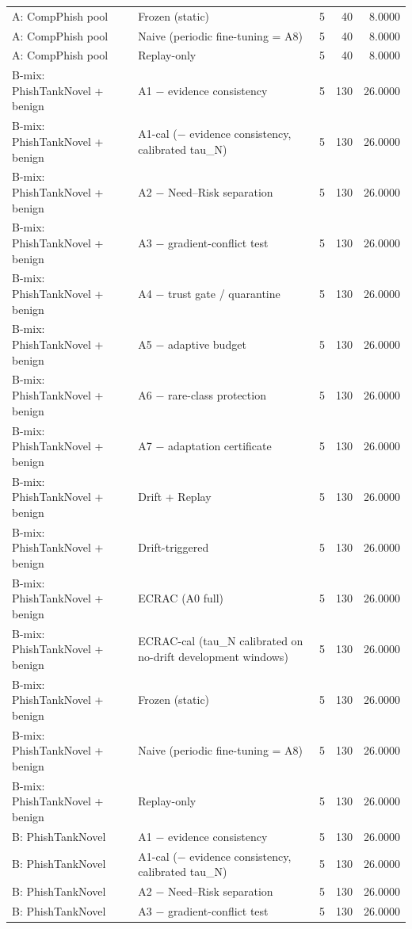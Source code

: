 \begin{table}[t]
\begin{tabular}{llrrr}
A: CompPhish pool & Frozen (static) & 5 & 40 & 8.0000 \\
A: CompPhish pool & Naive (periodic fine-tuning = A8) & 5 & 40 & 8.0000 \\
A: CompPhish pool & Replay-only & 5 & 40 & 8.0000 \\
B-mix: PhishTankNovel + benign & A1 − evidence consistency & 5 & 130 & 26.0000 \\
B-mix: PhishTankNovel + benign & A1-cal (− evidence consistency, calibrated tau\_N) & 5 & 130 & 26.0000 \\
B-mix: PhishTankNovel + benign & A2 − Need–Risk separation & 5 & 130 & 26.0000 \\
B-mix: PhishTankNovel + benign & A3 − gradient-conflict test & 5 & 130 & 26.0000 \\
B-mix: PhishTankNovel + benign & A4 − trust gate / quarantine & 5 & 130 & 26.0000 \\
B-mix: PhishTankNovel + benign & A5 − adaptive budget & 5 & 130 & 26.0000 \\
B-mix: PhishTankNovel + benign & A6 − rare-class protection & 5 & 130 & 26.0000 \\
B-mix: PhishTankNovel + benign & A7 − adaptation certificate & 5 & 130 & 26.0000 \\
B-mix: PhishTankNovel + benign & Drift + Replay & 5 & 130 & 26.0000 \\
B-mix: PhishTankNovel + benign & Drift-triggered & 5 & 130 & 26.0000 \\
B-mix: PhishTankNovel + benign & ECRAC (A0 full) & 5 & 130 & 26.0000 \\
B-mix: PhishTankNovel + benign & ECRAC-cal (tau\_N calibrated on no-drift development windows) & 5 & 130 & 26.0000 \\
B-mix: PhishTankNovel + benign & Frozen (static) & 5 & 130 & 26.0000 \\
B-mix: PhishTankNovel + benign & Naive (periodic fine-tuning = A8) & 5 & 130 & 26.0000 \\
B-mix: PhishTankNovel + benign & Replay-only & 5 & 130 & 26.0000 \\
B: PhishTankNovel & A1 − evidence consistency & 5 & 130 & 26.0000 \\
B: PhishTankNovel & A1-cal (− evidence consistency, calibrated tau\_N) & 5 & 130 & 26.0000 \\
B: PhishTankNovel & A2 − Need–Risk separation & 5 & 130 & 26.0000 \\
B: PhishTankNovel & A3 − gradient-conflict test & 5 & 130 & 26.0000 \\

\end{tabular}
\end{table}
